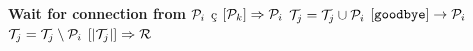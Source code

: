 \documentclass{article}
\begin{document}
\pagestyle{empty}

\newcommand{\send}{\Rightarrow}
\newcommand{\sendto}{\rightarrow}
\newcommand{\recv}{\Leftarrow}
\algrenewcommand{}

\begin{algorithmic}

  \State \textbf{Wait for connection from} ${\cal P}_i$
  ç
  \State $[{\cal P}_k] \send {\cal P}_i$
  \EndFor
  \State ${\cal T}_j={\cal T}_j \cup {\cal P}_i$
  \Else
  \State $[\mathtt{goodbye}] \sendto {\cal P}_i$
  \State ${\cal T}_j={\cal T}_j \setminus {\cal P}_i$
  \EndIf
  \State $[|{\cal T}_j|] \send {\cal R}$
  \EndWhile
  \EndProcedure
  
\end{algorithmic}
\end{document}
